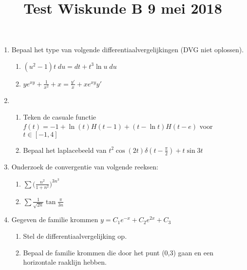 \documentclass{article}
\begin{document}
\title{Test Wiskunde B 9 mei 2018}
\date{}
\author{}
\maketitle

\begin{enumerate}
	\item{Bepaal het type van volgende differentiaalvergelijkingen (DVG niet oplossen).
        \begin{enumerate}
         \item $(u^2 - 1)t\;du = dt + t^3\ln u\;du$
         \item $ye^{xy} + \frac{1}{x^2} + x = \frac{y'}{x} + xe^{xy}y'$
        \end{enumerate}
	}
	\item{
        \begin{enumerate}
         \item Teken de casuale functie $f(t) = -1 + \ln(t)H(t - 1) + (t - \ln t)H(t - e)$ voor $t \in [-1, 4]$
        \item Bepaal het laplacebeeld van $t^2\cos(2t)\delta(t - \frac{\pi}{2}) + t\sin 3t$
        \end{enumerate}
	}
	\item{
        Onderzoek de convergentie van volgende reeksen:
        \begin{enumerate}
            \item $\sum \big(\frac{n^2}{1+n^2}\big)^{3n^3}$
            \item $\sum \frac{1}{\sqrt{2n}}\tan \frac{\pi}{3n}$
        \end{enumerate}
	}
	\item{
        Gegeven de familie krommen $y = C_1e^{-x} + C_2e^{2x} + C_3$
        \begin{enumerate}
            \item Stel de differentiaalvergelijking op.
            \item Bepaal de familie krommen die door het punt (0,3) gaan en een horizontale raaklijn hebben.
        \end{enumerate}
	}
\end{enumerate}
\end{document}
